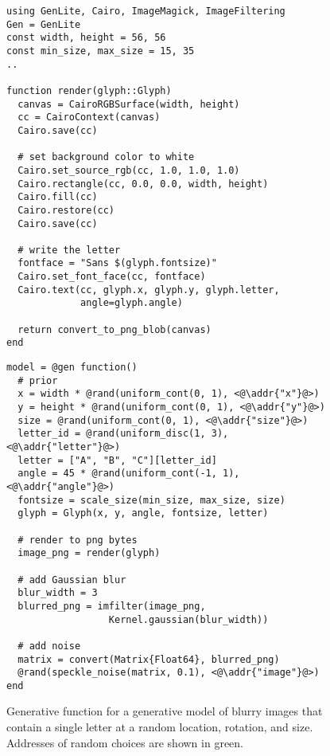 \begin{figure}[t]
\begin{minipage}[t]{0.5\textwidth}
\begin{lstlisting}
using GenLite, Cairo, ImageMagick, ImageFiltering
Gen = GenLite
const width, height = 56, 56
const min_size, max_size = 15, 35
..

function render(glyph::Glyph)
  canvas = CairoRGBSurface(width, height)
  cc = CairoContext(canvas)
  Cairo.save(cc)

  # set background color to white
  Cairo.set_source_rgb(cc, 1.0, 1.0, 1.0)
  Cairo.rectangle(cc, 0.0, 0.0, width, height)
  Cairo.fill(cc)
  Cairo.restore(cc)
  Cairo.save(cc)

  # write the letter
  fontface = "Sans $(glyph.fontsize)"
  Cairo.set_font_face(cc, fontface)
  Cairo.text(cc, glyph.x, glyph.y, glyph.letter,
             angle=glyph.angle)

  return convert_to_png_blob(canvas)
end
\end{lstlisting}
\end{minipage}%
\begin{minipage}[t]{0.5\textwidth}
\begin{lstlisting}
model = @gen function()
  # prior
  x = width * @rand(uniform_cont(0, 1), <@\addr{"x"}@>)
  y = height * @rand(uniform_cont(0, 1), <@\addr{"y"}@>)
  size = @rand(uniform_cont(0, 1), <@\addr{"size"}@>)
  letter_id = @rand(uniform_disc(1, 3), <@\addr{"letter"}@>)
  letter = ["A", "B", "C"][letter_id]
  angle = 45 * @rand(uniform_cont(-1, 1), <@\addr{"angle"}@>)
  fontsize = scale_size(min_size, max_size, size)
  glyph = Glyph(x, y, angle, fontsize, letter)

  # render to png bytes
  image_png = render(glyph)

  # add Gaussian blur
  blur_width = 3
  blurred_png = imfilter(image_png,
                  Kernel.gaussian(blur_width))

  # add noise
  matrix = convert(Matrix{Float64}, blurred_png)
  @rand(speckle_noise(matrix, 0.1), <@\addr{"image"}@>)
end
\end{lstlisting}
\end{minipage}
\caption{Generative function for a generative model of blurry images that contain a single letter at a random location, rotation, and size. Addresses of random choices are shown in green.}
\label{fig:model-code-figure}
\end{figure}
